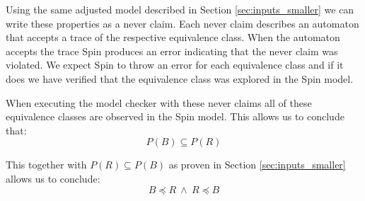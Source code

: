 \documentclass[runningheads]{llncs}
\begin{document}
Using the same adjusted model described in Section \ref{sec:inputs_smaller} we can write these properties as a never claim. Each never claim describes an automaton that accepts a trace of the respective equivalence class. When the automaton accepts the trace Spin produces an error indicating that the never claim was violated. We expect Spin to throw an error for each equivalence class and if it does we have verified that the equivalence class was explored in the Spin model. 

When executing the model checker with these never claims all of these equivalence classes are observed in the Spin model. This allows us to conclude that:
$$P(B) \subseteq P(R)$$

This together with $P(R) \subseteq P(B)$ as proven in Section \ref{sec:inputs_smaller} allows us to conclude:
$$B \preceq R\  \wedge\  R \preceq B$$
    
\end{document}
